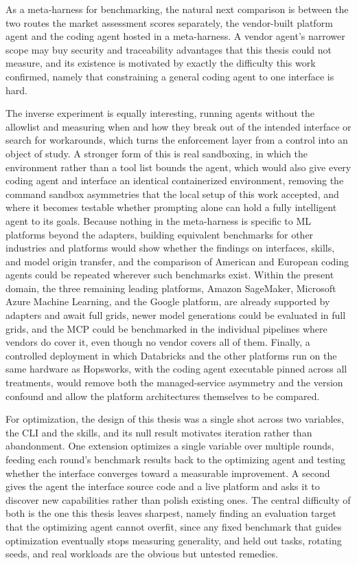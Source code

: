 \documentclass[
english,                 %
bibtex,                  %
]{kththesis}
\numberwithin{listing}{chapter}
\begin{document}
As a meta-harness for benchmarking, the natural next comparison is between the two routes the market assessment scores separately, the vendor-built platform agent and the coding agent hosted in a meta-harness. A vendor agent's narrower scope may buy security and traceability advantages that this thesis could not measure, and its existence is motivated by exactly the difficulty this work confirmed, namely that constraining a general coding agent to one interface is hard.

The inverse experiment is equally interesting, running agents without the allowlist and measuring when and how they break out of the intended interface or search for workarounds, which turns the enforcement layer from a control into an object of study. A stronger form of this is real sandboxing, in which the environment rather than a tool list bounds the agent, which would also give every coding agent and interface an identical containerized environment, removing the command sandbox asymmetries that the local setup of this work accepted, and where it becomes testable whether prompting alone can hold a fully intelligent agent to its goals. Because nothing in the meta-harness is specific to \gls{ML} platforms beyond the adapters, building equivalent benchmarks for other industries and platforms would show whether the findings on interfaces, skills, and model origin transfer, and the comparison of American and European coding agents could be repeated wherever such benchmarks exist. Within the present domain, the three remaining leading platforms, Amazon SageMaker, Microsoft Azure Machine Learning, and the Google platform, are already supported by adapters and await full grids, newer model generations could be evaluated in full grids, and the \gls{MCP} could be benchmarked in the individual pipelines where vendors do cover it, even though no vendor covers all of them. Finally, a controlled deployment in which Databricks and the other platforms run on the same hardware as Hopsworks, with the coding agent executable pinned across all treatments, would remove both the managed-service asymmetry and the version confound and allow the platform architectures themselves to be compared.

For optimization, the design of this thesis was a single shot across two variables, the \gls{CLI} and the skills, and its null result motivates iteration rather than abandonment. One extension optimizes a single variable over multiple rounds, feeding each round's benchmark results back to the optimizing agent and testing whether the interface converges toward a measurable improvement. A second gives the agent the interface source code and a live platform and asks it to discover new capabilities rather than polish existing ones. The central difficulty of both is the one this thesis leaves sharpest, namely finding an evaluation target that the optimizing agent cannot overfit, since any fixed benchmark that guides optimization eventually stops measuring generality, and held out tasks, rotating seeds, and real workloads are the obvious but untested remedies.
\end{document}

